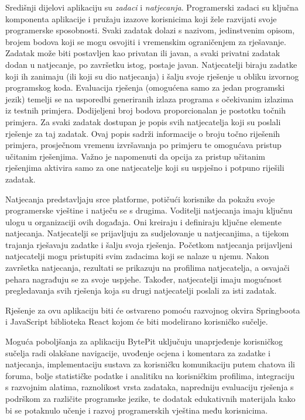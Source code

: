 		Središnji dijelovi aplikaciju su \emph{zadaci} i \emph{natjecanja}. Programerski zadaci su ključna komponenta aplikacije i pružaju izazove korisnicima koji žele razvijati svoje programerske sposobnosti. Svaki zadatak dolazi s nazivom, jedinstvenim opisom, brojem bodova koji se mogu osvojiti i vremenskim ograničenjem za rješavanje. Zadatak može biti postavljen kao privatan ili javan, a svaki privatni zadatak dodan u natjecanje, po završetku istog, postaje javan. Natjecatelji biraju zadatke koji ih zanimaju (ili koji su dio natjecanja) i šalju svoje rješenje u obliku izvornog programskog koda. Evaluacija rješenja (omogućena samo za jedan programski jezik) temelji se na usporedbi generiranih izlaza programa s očekivanim izlazima iz testnih primjera. Dodijeljeni broj bodova proporcionalan je postotku točnih primjera. Za svaki zadatak dostupan je popis svih natjecatelja koji su poslali rješenje za taj zadatak. Ovaj popis sadrži informacije o broju točno riješenih primjera, prosječnom vremenu izvršavanja po primjeru te omogućava pristup učitanim rješenjima. Važno je napomenuti da opcija za pristup učitanim rješenjima aktivira samo za one natjecatelje koji su uspješno i potpuno riješili zadatak.
		
		Natjecanja predstavljaju srce platforme, potičući korisnike da pokažu svoje programerske vještine i natječu se s drugima. Voditelji natjecanja imaju ključnu ulogu u organizaciji ovih događaja. Oni kreiraju i definiraju ključne elemente natjecanja. Natjecatelji se prijavljuju za sudjelovanje u natjecanjima, a tijekom trajanja rješavaju zadatke i šalju svoja rješenja. Početkom natjecanja prijavljeni natjecatelji mogu pristupiti svim zadacima koji se nalaze u njemu. Nakon završetka natjecanja, rezultati se prikazuju na profilima natjecatelja, a osvajači pehara nagrađuju se za svoje uspjehe. Također, natjecatelji imaju mogućnost pregledavanja svih rješenja koja su drugi natjecatelji poslali za isti zadatak.
		
		Rješenje za ovu aplikaciju biti će ostvareno pomoću razvojnog okvira Springboota i JavaScript biblioteka React kojom će biti modelirano korisničko sučelje.
		
		Moguća poboljšanja za aplikaciju BytePit uključuju unaprjeđenje korisničkog sučelja radi olakšane navigacije, uvođenje ocjena i komentara za zadatke i natjecanja, implementaciju sustava za korisničku komunikaciju putem chatova ili foruma, bolje statističke podatke i analitiku na korisničkim profilima, integraciju s razvojnim alatima, raznolikost vrsta zadataka, napredniju evaluaciju rješenja s podrškom za različite programske jezike, te dodatak edukativnih materijala kako bi se potaknulo učenje i razvoj programerskih vještina među korisnicima. 
		
		
		
	